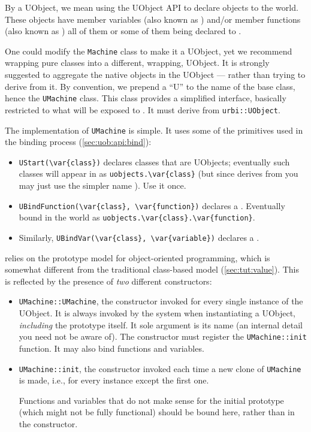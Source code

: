 By  a UObject, we mean using the UObject API to declare objects
to the \urbi world.  These objects have member variables (also known as
) and/or member functions (also known as ) all
of them or some of them being declared to \urbi.

One could modify the \lstinline|Machine| class to make it a UObject, yet we
recommend wrapping pure \Cxx classes into a different, wrapping, UObject.
It is strongly suggested to aggregate the native \Cxx objects in the UObject
--- rather than trying to derive from it.  By convention, we prepend a ``U''
to the name of the base class, hence the \lstinline|UMachine| class.  This
class provides a simplified interface, basically restricted to what will be
exposed to \urbi.  It must derive from \lstinline|urbi::UObject|.


The implementation of \lstinline|UMachine| is simple.  It uses some of the
primitives used in the binding process (\autoref{sec:uob:api:bind}):
\begin{itemize}
\item \lstinline|UStart(\var{class})| declares classes that are UObjects;
  eventually such classes will appear in \us as
  \lstinline|uobjects.\var{class}| (but since  derives
  from  you may just use the simpler name ).
  Use it once.

\item \lstinline|UBindFunction(\var{class}, \var{function})| declares a
  .  Eventually bound in the \us world as
  \lstinline|uobjects.\var{class}.\var{function}|.

\item Similarly, \lstinline|UBindVar(\var{class}, \var{variable})| declares
  a .
\end{itemize}

\urbi relies on the prototype model for object-oriented programming, which
is somewhat different from the traditional \Cxx class-based model
(\autoref{sec:tut:value}).  This is reflected by the presence of \emph{two}
different constructors:
\begin{itemize}
\item \lstinline|UMachine::UMachine|, the \Cxx constructor invoked for every
  single instance of the UObject.  It is always invoked by the \urbi system
  when instantiating a UObject, \emph{including} the prototype itself.  It
  sole argument is its name (an internal detail you need not be aware of).
  The \Cxx constructor must register the \lstinline|UMachine::init|
  function.  It may also bind functions and variables.

\item \lstinline|UMachine::init|, the \urbi constructor invoked each time a
  new clone of \lstinline|UMachine| is made, i.e., for every instance except
  the first one.

  Functions and variables that do not make sense for the initial prototype
  (which might not be fully functional) should be bound here, rather than in
  the \Cxx constructor.
\end{itemize}


